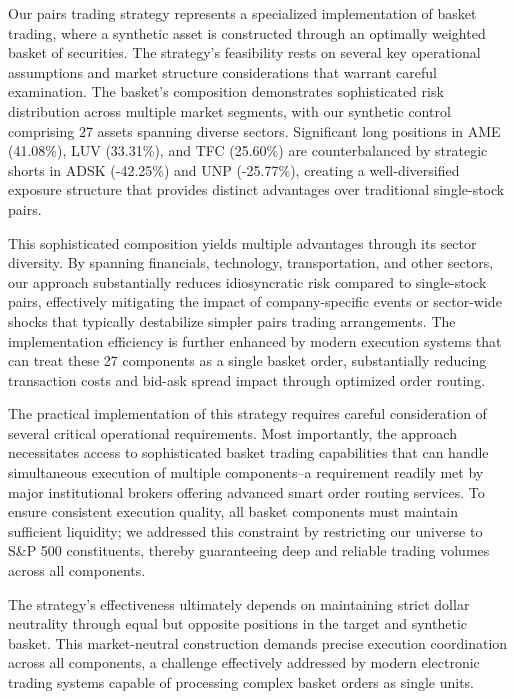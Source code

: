 Our pairs trading strategy represents a specialized implementation of basket trading, where a synthetic asset is constructed through an optimally weighted basket of securities. The strategy's feasibility rests on several key operational assumptions and market structure considerations that warrant careful examination. The basket's composition demonstrates sophisticated risk distribution across multiple market segments, with our synthetic control comprising 27 assets spanning diverse sectors. Significant long positions in AME (41.08\%), LUV (33.31\%), and TFC (25.60\%) are counterbalanced by strategic shorts in ADSK (-42.25\%) and UNP (-25.77\%), creating a well-diversified exposure structure that provides distinct advantages over traditional single-stock pairs.

This sophisticated composition yields multiple advantages through its sector diversity. By spanning financials, technology, transportation, and other sectors, our approach substantially reduces idiosyncratic risk compared to single-stock pairs, effectively mitigating the impact of company-specific events or sector-wide shocks that typically destabilize simpler pairs trading arrangements. The implementation efficiency is further enhanced by modern execution systems that can treat these 27 components as a single basket order, substantially reducing transaction costs and bid-ask spread impact through optimized order routing.

The practical implementation of this strategy requires careful consideration of several critical operational requirements. Most importantly, the approach necessitates access to sophisticated basket trading capabilities that can handle simultaneous execution of multiple components--a requirement readily met by major institutional brokers offering advanced smart order routing services. To ensure consistent execution quality, all basket components must maintain sufficient liquidity; we addressed this constraint by restricting our universe to S\&P 500 constituents, thereby guaranteeing deep and reliable trading volumes across all components.

The strategy's effectiveness ultimately depends on maintaining strict dollar neutrality through equal but opposite positions in the target and synthetic basket. This market-neutral construction demands precise execution coordination across all components, a challenge effectively addressed by modern electronic trading systems capable of processing complex basket orders as single units. 

